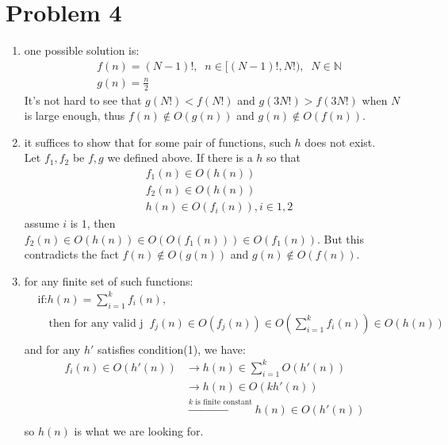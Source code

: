 \documentclass[paper=a4, fontsize=11pt]{scrartcl} %
\numberwithin{equation}{section} %
\numberwithin{figure}{section} %
\numberwithin{table}{section} %
\begin{document}
\section*{Problem 4}
\begin{enumerate}[label={4.\arabic*}]
  \item one possible solution is:
    \begin{align*}
      & f(n) = (N-1)!, \;\;n \in [(N-1)!, N!),\;\;N \in \mathbb{N}\\
      & g(n) = \frac{n}{2}
    \end{align*}
    It's not hard to see that $g(N!) < f(N!)$ and $g(3N!) > f(3N!)$ when $N$ is large enough, thus
    $f(n) \notin O(g(n))$ and $g(n) \notin O(f(n))$.

  \item it suffices to show that for some pair of functions, such $h$ does not exist.\\
    Let $f_1,f_2$ be $f,g$ we defined above. If there is a $h$ so that 
    \begin{align*}
      & f_1(n) \in O(h(n)) \\
      & f_2(n) \in O(h(n)) \\
      & h(n) \in O(f_i(n)), i \in {1,2}
    \end{align*}
    assume $i$ is $1$, then $f_2(n) \in O(h(n)) \in O(O(f_1(n))) \in O(f_1(n))$. But this
    contradicts the fact $f(n) \notin O(g(n))$ and $g(n) \notin O(f(n))$.

  \item for any finite set of such functions:
    \begin{align*}
      &\text{if:} h(n)= \sum^{k}_{i=1}f_i(n), \\
      &\quad \text{then for any valid j}\;\; f_j(n) \in O(f_j(n)) \in O(\sum^{k}_{i=1}f_i(n)) \in O(h(n)) \\
    \end{align*}
    and for any $h'$ satisfies condition(1), we have:
    \begin{align*}
      f_i(n) \in O(h'(n)) & \rightarrow h(n) \in \sum^{k}_{i=1}O(h'(n)) \\
			  & \rightarrow h(n) \in O(kh'(n))\\
     			  & \xrightarrow{\text{$k$ is finite constant}} h(n) \in O(h'(n))\\
    \end{align*}
    so $h(n)$ is what we are looking for.
\end{enumerate}
\end{document}
